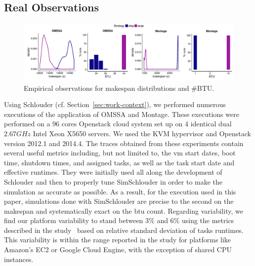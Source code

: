 \documentclass[]{llncs}
\begin{document}
\subsection{Real Observations}
\begin{figure}
	\centering
	\includegraphics[width=\textwidth]{gfx/real_plot.pdf}
	\caption[caption]{Empirical observations for makespan distributions and \#BTU.%
	  }
	\label{fig:realbrs}
\end{figure}

Using  Schlouder  (cf.  Section~\ref{sec:work-context}), we  performed  numerous
executions  of the  application  of  OMSSA and  Montage.  These executions  were
performed  on a  96 cores  Openstack cloud  system set  up on  4 identical  dual
$2.67GHz$ Intel  Xeon X5650 servers.  We used  the KVM hypervisor  and Openstack
version 2012.1  and 2014.4. The  traces obtained from these  experiments contain
several useful metrics  including, but not limited to, the  \ac{vm} start dates,
boot time, shutdown  times, and assigned tasks,  as well as the  task start date
and effective runtimes.
%
They were  initially used  all along  the development of  Schlouder and  then to
properly  tune SimSchlouder  in  order to  make the  simulation  as accurate  as
possible. As  a result, for the  execution used in this  paper, simulations done
with SimSchlouder are  precise to the second on the  makespan and systematically
exact on the \ac{btu} count.
%
Regarding variability, we find our platform variability to stand between 3\% and
6\% using the metrics described in the study~\cite{LeitnerC16} based on relative
standard  deviation of  tasks runtimes.   This variability  is within  the range
reported in  the study for platforms  like Amazon's EC2 or  Google Cloud Engine,
with the exception of shared CPU instances.
\end{document}
